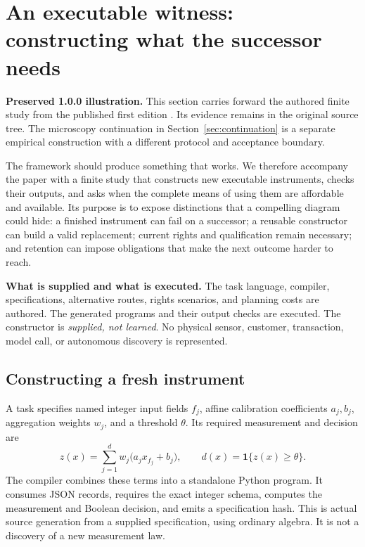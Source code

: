 \section{An executable witness: constructing what the successor needs}\label{sec:study}

\begin{statusbox}
\textbf{Preserved 1.0.0 illustration.} This section carries forward the authored finite study from the published first edition \citep{learningBuildOriginal}. Its evidence remains in the original source tree. The microscopy continuation in Section~\ref{sec:continuation} is a separate empirical construction with a different protocol and acceptance boundary.
\end{statusbox}

The framework should produce something that works. We therefore accompany the
paper with a finite study that constructs new executable instruments, checks their
outputs, and asks when the complete means of using them are affordable and
available. Its purpose is to expose distinctions that a compelling diagram could
hide: a finished instrument can fail on a successor; a reusable constructor can
build a valid replacement; current rights and qualification remain necessary; and
retention can impose obligations that make the next outcome harder to reach.

\begin{statusbox}
\textbf{What is supplied and what is executed.} The task language, compiler,
specifications, alternative routes, rights scenarios, and planning costs are
authored. The generated programs and their output checks are executed. The
constructor is \emph{supplied, not learned}. No physical sensor, customer,
transaction, model call, or autonomous discovery is represented.
\end{statusbox}

\subsection{Constructing a fresh instrument}

A task specifies named integer input fields $f_j$, affine calibration coefficients
$a_j,b_j$, aggregation weights $w_j$, and a threshold $\theta$. Its required
measurement and decision are
\begin{equation}
 z(x)=\sum_{j=1}^{d}w_j\bigl(a_jx_{f_j}+b_j\bigr),
 \qquad d(x)=\mathbf 1\{z(x)\geq\theta\}.
 \label{eq:study-instrument}
\end{equation}
The compiler combines these terms into a standalone Python program. It consumes
JSON records, requires the exact integer schema, computes the measurement and
Boolean decision, and emits a specification hash. This is actual source
generation from a supplied specification, using ordinary algebra. It is not a
discovery of a new measurement law.

